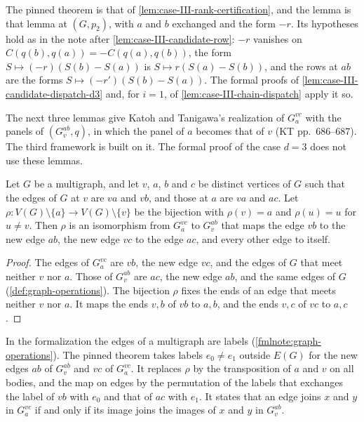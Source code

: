 \begin{fmlnote}
  The pinned theorem is that of \cref{lem:case-III-rank-certification},
  and the lemma is that lemma at $(G, p_2)$, with $a$ and $b$ exchanged
  and the form $-r$. Its hypotheses hold as in the note after
  \cref{lem:case-III-candidate-row}: $-r$ vanishes on
  $C(q(b), q(a)) = -C(q(a), q(b))$, the form
  $S \mapsto (-r)(S(b) - S(a))$ is $S \mapsto r(S(a) - S(b))$, and the
  rows at $ab$ are the forms $S \mapsto (-r')(S(b) - S(a))$. The formal
  proofs of \cref{lem:case-III-candidate-dispatch-d3} and, for $i = 1$,
  of \cref{lem:case-III-chain-dispatch} apply it so.
\end{fmlnote}

The next three lemmas give Katoh and Tanigawa's realization of
$G_a^{vc}$ with the panels of $(G_v^{ab}, q)$, in which the panel of $a$
becomes that of $v$ (KT pp.~686--687). The third framework is built on
it. The formal proof of the case $d = 3$ does not use these lemmas.

\begin{lemma}
  \label{lem:splitOff-isLink-relabel}
  \leanok
  Let $G$ be a multigraph, and let $v$, $a$, $b$ and $c$ be distinct
  vertices of $G$ such that the edges of $G$ at $v$ are $va$ and $vb$,
  and those at $a$ are $va$ and $ac$. Let
  $\rho \colon V(G) \setminus \{a\} \to V(G) \setminus \{v\}$ be the
  bijection with $\rho(v) = a$ and $\rho(u) = u$ for $u \neq v$. Then
  $\rho$ is an isomorphism from $G_a^{vc}$ to $G_v^{ab}$ that maps the
  edge $vb$ to the new edge $ab$, the new edge $vc$ to the edge $ac$, and
  every other edge to itself.
\end{lemma}
\begin{proof}
  \leanok
  The edges of $G_a^{vc}$ are $vb$, the new edge $vc$, and the edges of
  $G$ that meet neither $v$ nor $a$. Those of $G_v^{ab}$ are $ac$, the
  new edge $ab$, and the same edges of $G$ (\cref{def:graph-operations}).
  The bijection $\rho$ fixes the ends of an edge that meets neither $v$
  nor $a$. It maps the ends $v, b$ of $vb$ to $a, b$, and the ends $v, c$
  of $vc$ to $a, c$.
\end{proof}

\begin{fmlnote}
  In the formalization the edges of a multigraph are labels
  (\cref{fmlnote:graph-operations}). The pinned theorem takes labels
  $e_0 \neq e_1$ outside $E(G)$ for the new edges $ab$ of $G_v^{ab}$ and
  $vc$ of $G_a^{vc}$. It replaces $\rho$ by the transposition of $a$ and
  $v$ on all bodies, and the map on edges by the permutation of the
  labels that exchanges the label of $vb$ with $e_0$ and that of $ac$
  with $e_1$. It states that an edge joins $x$ and $y$ in $G_a^{vc}$ if
  and only if its image joins the images of $x$ and $y$ in $G_v^{ab}$.
\end{fmlnote}

